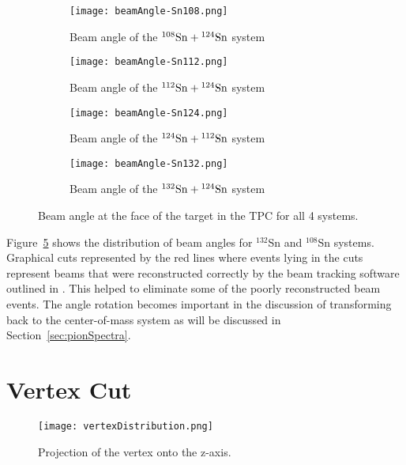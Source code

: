 \begin{figure}[!htb]
    \centering
    \begin{subfigure}[t]{0.45\textwidth}
        \centering
        \texttt{[image: beamAngle-Sn108.png]} 
        \caption{Beam angle of the ${}^{108}\mathrm{Sn} + {}^{124}\mathrm{Sn}$ system} \label{fig:beamangle108}
    \end{subfigure}
    \hfill
    \begin{subfigure}[t]{0.45\textwidth}
        \centering
        \texttt{[image: beamAngle-Sn112.png]} 
        \caption{Beam angle of the ${}^{112}\mathrm{Sn} + {}^{124}\mathrm{Sn}$ system} \label{fig:beamangle112}
    \end{subfigure}
    
    \begin{subfigure}[t]{0.45\textwidth}
        \centering
        \texttt{[image: beamAngle-Sn124.png]} 
        \caption{Beam angle of the ${}^{124}\mathrm{Sn} + {}^{112}\mathrm{Sn}$ system} \label{fig:beamangle124}
    \end{subfigure}
    \hfill
    \begin{subfigure}[t]{0.45\textwidth}
        \centering
        \texttt{[image: beamAngle-Sn132.png]} 
        \caption{Beam angle of the ${}^{132}\mathrm{Sn} + {}^{124}\mathrm{Sn}$ system} \label{fig:beamangle132}
    \end{subfigure}
\caption{Beam angle at the face of the target in the TPC for all 4 systems.}
\label{fig:beamangle}
\end{figure}


Figure~\ref{fig:beamangle} shows the distribution of beam angles for ${}^{132}$Sn and ${}^{108}$Sn systems. Graphical cuts represented by the red lines where events lying in the cuts represent beams that were reconstructed correctly by the beam tracking software outlined in \cite{jon}. This helped to eliminate some of the poorly reconstructed beam events. The angle rotation becomes important in the discussion of transforming back to the center-of-mass system as will be discussed in Section~\ref{sec:pionSpectra}.



\section{Vertex Cut}
\label{sec:vertexcut}

\begin{figure}[!htb]
\centering
\texttt{[image: vertexDistribution.png]}
\caption{Projection of the vertex onto the z-axis.}
\label{fig:overviewVertex}
\end{figure}


